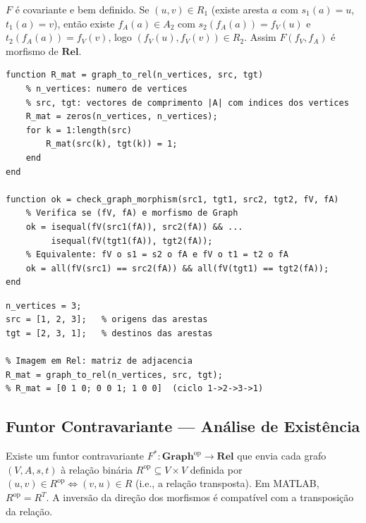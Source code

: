 \begin{proposition}
$F$ é covariante e bem definido. Se $(u, v) \in R_1$ (existe aresta $a$ com $s_1(a)=u$, $t_1(a)=v$), então existe $f_A(a) \in A_2$ com $s_2(f_A(a)) = f_V(u)$ e $t_2(f_A(a)) = f_V(v)$, logo $(f_V(u), f_V(v)) \in R_2$. Assim $F(f_V, f_A)$ é morfismo de $\mathbf{Rel}$.
\end{proposition}

\begin{lstlisting}[style=matlab, caption={Funtor $F: \mathbf{Graph} \to \mathbf{Rel}$ --- construção da matriz de adjacência}]
function R_mat = graph_to_rel(n_vertices, src, tgt)
    % n_vertices: numero de vertices
    % src, tgt: vectores de comprimento |A| com indices dos vertices
    R_mat = zeros(n_vertices, n_vertices);
    for k = 1:length(src)
        R_mat(src(k), tgt(k)) = 1;
    end
end

function ok = check_graph_morphism(src1, tgt1, src2, tgt2, fV, fA)
    % Verifica se (fV, fA) e morfismo de Graph
    ok = isequal(fV(src1(fA)), src2(fA)) && ...
         isequal(fV(tgt1(fA)), tgt2(fA));
    % Equivalente: fV o s1 = s2 o fA e fV o t1 = t2 o fA
    ok = all(fV(src1) == src2(fA)) && all(fV(tgt1) == tgt2(fA));
end
\end{lstlisting}

\begin{lstlisting}[style=matlab, caption={Exemplo: grafo com 3 vértices e aplicação do funtor}]
% Grafo G: vertices {1,2,3}, arestas {a1: 1->2, a2: 2->3, a3: 3->1}
n_vertices = 3;
src = [1, 2, 3];   % origens das arestas
tgt = [2, 3, 1];   % destinos das arestas

% Imagem em Rel: matriz de adjacencia
R_mat = graph_to_rel(n_vertices, src, tgt);
% R_mat = [0 1 0; 0 0 1; 1 0 0]  (ciclo 1->2->3->1)
\end{lstlisting}

\subsection{Funtor Contravariante --- Análise de Existência}

\begin{proposition}
Existe um funtor contravariante $F^*: \mathbf{Graph}^{\mathrm{op}} \to \mathbf{Rel}$ que envia cada grafo $(V, A, s, t)$ à relação binária $R^{\mathrm{op}} \subseteq V \times V$ definida por $(u, v) \in R^{\mathrm{op}} \iff (v, u) \in R$ (i.e., a relação transposta). Em MATLAB, $R^{\mathrm{op}} = R^T$. A inversão da direção dos morfismos é compatível com a transposição da relação.
\end{proposition}

